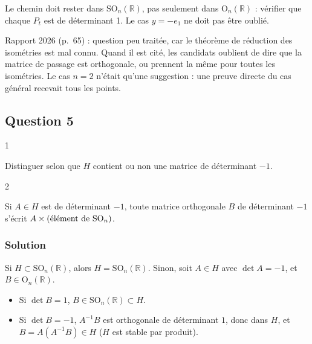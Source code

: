 \documentclass[11pt,a4paper]{article}
\providecommand{\tightlist}{\setlength{\itemsep}{0pt}\setlength{\parskip}{0pt}}
\begin{document}
\begin{piege}

Le chemin doit rester dans \({\mathrm{SO}}_n(\mathbb{R})\), pas seulement dans \({\mathrm{O}}_n(\mathbb{R})\) : vérifier que chaque \(P_t\) est de déterminant 1. Le cas \(y=-e_1\) ne doit pas être oublié.

\end{piege}

\begin{jury}

Rapport 2026 (p.~65) : question peu traitée, car le théorème de réduction des isométries est mal connu. Quand il est cité, les candidats oublient de dire que la matrice de passage est orthogonale, ou prennent la même pour toutes les isométries. Le cas \(n=2\) n'était qu'une suggestion : une preuve directe du cas général recevait tous les points.

\end{jury}

\hypertarget{question-5}{%
\subsection{Question 5}\label{question-5}}

\begin{indication}{1}

Distinguer selon que \(H\) contient ou non une matrice de déterminant \(-1\).

\end{indication}

\begin{indication}{2}

Si \(A\in H\) est de déterminant \(-1\), toute matrice orthogonale \(B\) de déterminant \(-1\) s'écrit \(A\times(\text{\text{élément} de }{\mathrm{SO}}_n)\).

\end{indication}

\hypertarget{solution-4}{%
\subsubsection{Solution}\label{solution-4}}

Si \(H\subset{\mathrm{SO}}_n(\mathbb{R})\), alors \(H={\mathrm{SO}}_n(\mathbb{R})\). Sinon, soit \(A\in H\) avec \(\det A=-1\), et \(B\in{\mathrm{O}}_n(\mathbb{R})\).

\begin{itemize}
\tightlist
\item
  Si \(\det B=1\), \(B\in{\mathrm{SO}}_n(\mathbb{R})\subset H\).
\item
  Si \(\det B=-1\), \(A^{-1}B\) est orthogonale de déterminant \(1\), donc dans \(H\), et \(B=A(A^{-1}B)\in H\) (\(H\) est stable par produit).
\end{itemize}
\end{document}
